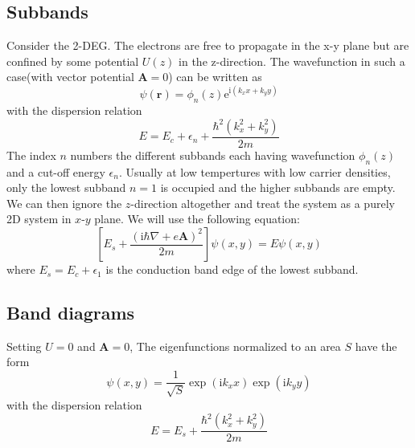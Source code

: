 \documentclass[11pt,a4paper]{book}
\theoremstyle{plain}
\theoremstyle{definition}
\theoremstyle{remark}
\newcommand{\ii}{\mathrm{i}}                      %
\newcommand{\eexp}{\mathrm{e}}                    %
\renewcommand{\vec}[1]{\boldsymbol{#1}}
\begin{document}
\subsection{Subbands}
Consider the 2-DEG. The electrons are free to propagate in the x-y plane but are confined by some potential $U(z)$ in the z-direction. The wavefunction in such a case(with vector potential $\vec{A}=0$) can be written as
\begin{equation}
    \psi(\vec{r}) = \phi_n(z) \eexp^{\ii \left(k_x x + k_y y\right)}
\end{equation}
with the dispersion relation
\begin{equation}
    E = E_c +  \epsilon_n + \frac{\hbar^2 \left(k_x^2 + k_y^2\right)}{2 m}
\end{equation}
The index $n$ numbers the different subbands each having wavefunction $\phi_n(z)$ and a cut-off energy $\epsilon_n$. Usually at low tempertures with low carrier densities, only the lowest subband $n=1$ is occupied and the higher subbands are empty. We can then ignore the $z$-direction altogether and treat the system as a purely 2D system in $x$-$y$ plane. We will use the following equation:
\begin{equation}
    \left[E_s+\frac{(\ii \hbar \nabla + e \vec{A})^2}{2 m}\right] \psi(x,y) = E \psi(x,y)
\end{equation}
where $E_s = E_c + \epsilon_1$ is the conduction band edge of the lowest subband.

\subsection{Band diagrams}
Setting $U=0$ and $\vec{A}=0$, The eigenfunctions normalized to an area $S$ have the form
\begin{equation}
    \psi(x,y) = \frac{1}{\sqrt{S}}\exp(\ii k_x x) \exp (\ii k_y y)
\end{equation}
with the dispersion relation
\begin{equation}
    E = E_s + \frac{\hbar^2 \left(k_x^2 + k_y^2\right)}{2 m}
\end{equation}
\end{document}
